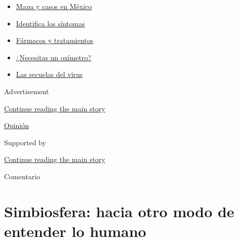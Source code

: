 \begin{itemize}
\tightlist
\item
  \href{https://www.nytimes3xbfgragh.onion/es/interactive/2020/espanol/america-latina/coronavirus-en-mexico.html?name=styln-coronavirus-es\&region=TOP_BANNER\&variant=undefined\&block=storyline_menu_recirc\&action=click\&pgtype=Article\&impression_id=0b13a211-e3a0-11ea-945d-0babcf13dc84}{Mapa
  y casos en México}
\item
  \href{https://www.nytimes3xbfgragh.onion/es/interactive/2020/08/06/espanol/ciencia-y-tecnologia/tengo-covid-19-sintomas.html?name=styln-coronavirus-es\&region=TOP_BANNER\&variant=undefined\&block=storyline_menu_recirc\&action=click\&pgtype=Article\&impression_id=0b13a212-e3a0-11ea-945d-0babcf13dc84}{Identifica
  los síntomas}
\item
  \href{https://www.nytimes3xbfgragh.onion/es/interactive/2020/science/coronavirus-tratamientos-curas.html?name=styln-coronavirus-es\&region=TOP_BANNER\&variant=undefined\&block=storyline_menu_recirc\&action=click\&pgtype=Article\&impression_id=0b13a213-e3a0-11ea-945d-0babcf13dc84}{Fármacos
  y tratamientos}
\item
  \href{https://www.nytimes3xbfgragh.onion/es/2020/04/29/espanol/estilos-de-vida/oximetro-para-que-sirve.html?name=styln-coronavirus-es\&region=TOP_BANNER\&variant=undefined\&block=storyline_menu_recirc\&action=click\&pgtype=Article\&impression_id=0b13c920-e3a0-11ea-945d-0babcf13dc84}{¿Necesitas
  un oxímetro?}
\item
  \href{https://www.nytimes3xbfgragh.onion/es/2020/07/02/espanol/ciencia-y-tecnologia/sobrevivientes-coronavirus-recuperacion.html?name=styln-coronavirus-es\&region=TOP_BANNER\&variant=undefined\&block=storyline_menu_recirc\&action=click\&pgtype=Article\&impression_id=0b13c921-e3a0-11ea-945d-0babcf13dc84}{Las
  secuelas del virus}
\end{itemize}

Advertisement

\protect\hyperlink{after-top}{Continue reading the main story}

\href{/es/section/opinion}{Opinión}

Supported by

\protect\hyperlink{after-sponsor}{Continue reading the main story}

Comentario

\hypertarget{simbiosfera-hacia-otro-modo-de-entender-lo-humano}{%
\section{Simbiosfera: hacia otro modo de entender lo
humano}\label{simbiosfera-hacia-otro-modo-de-entender-lo-humano}}

